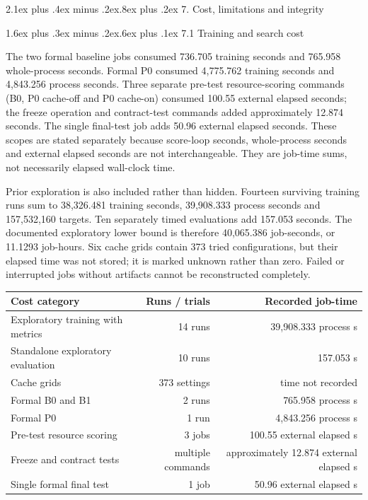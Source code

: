 \documentclass[11pt]{article}
\makeatletter
\renewcommand\section{\@startsection{section}{1}{0pt}%
  {2.1ex plus .4ex minus .2ex}{.8ex plus .2ex}%
  {\normalfont\large\bfseries}}
\renewcommand\subsection{\@startsection{subsection}{2}{0pt}%
  {1.6ex plus .3ex minus .2ex}{.6ex plus .1ex}%
  {\normalfont\normalsize\bfseries}}
\makeatother
\begin{document}
\section{7. Cost, limitations and
integrity}\label{7-cost-limitations-and-integrity}

\subsection{7.1 Training and search
cost}\label{71-training-and-search-cost}

The two formal baseline jobs consumed 736.705 training seconds and
765.958 whole-process seconds. Formal P0 consumed 4,775.762 training
seconds and 4,843.256 process seconds. Three separate pre-test
resource-scoring commands (B0, P0 cache-off and P0 cache-on) consumed
100.55 external elapsed seconds; the freeze operation and contract-test
commands added approximately 12.874 seconds. The single final-test job
adds 50.96 external elapsed seconds. These scopes are stated separately
because score-loop seconds, whole-process seconds and external elapsed
seconds are not interchangeable. They are job-time sums, not necessarily
elapsed wall-clock time.

Prior exploration is also included rather than hidden. Fourteen
surviving training runs sum to 38,326.481 training seconds, 39,908.333
process seconds and 157,532,160 targets. Ten separately timed
evaluations add 157.053 seconds. The documented exploratory lower bound
is therefore 40,065.386 job-seconds, or 11.1293 job-hours. Six cache
grids contain 373 tried configurations, but their elapsed time was not
stored; it is marked unknown rather than zero. Failed or interrupted
jobs without artifacts cannot be reconstructed completely.

\begin{longtable}[]{@{}lrr@{}}
\toprule\noalign{}
Cost category & Runs / trials & Recorded job-time \\
\midrule\noalign{}
\endhead
\bottomrule\noalign{}
\endlastfoot
Exploratory training with metrics & 14 runs & 39,908.333 process s \\
Standalone exploratory evaluation & 10 runs & 157.053 s \\
Cache grids & 373 settings & time not recorded \\
Formal B0 and B1 & 2 runs & 765.958 process s \\
Formal P0 & 1 run & 4,843.256 process s \\
Pre-test resource scoring & 3 jobs & 100.55 external elapsed s \\
Freeze and contract tests & multiple commands & approximately 12.874
external elapsed s \\
Single formal final test & 1 job & 50.96 external elapsed s \\
\end{longtable}
\end{document}
